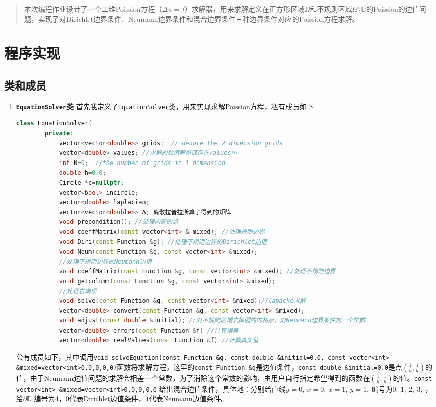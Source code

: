 \documentclass[UTF8]{ctexart}
\begin{document}
	
	\pagestyle{fancy}
	\fancyhead{}
	\rhead{\today}
	\begin{abstract}
		本次编程作业设计了一个二维Poission方程（$\Delta u=f$）求解器，用来求解定义在正方形区域$\Omega$和不规则区域$\Omega \setminus \mathbb{D}$的Poission的边值问题，实现了对Dirichlet边界条件、Neumann边界条件和混合边界条件三种边界条件对应的Poission方程求解。
	\end{abstract}
	\section{程序实现}
	\subsection{类和成员}
	\begin{enumerate}
		\item  \textbf{\texttt{EquationSolver}类}	首先我定义了\texttt{EquationSolver}类，用来实现求解Poission方程，私有成员如下
		\begin{lstlisting}[language=C++, caption={运算符实现}, label={lst:operators}]
		class EquationSolver{
		private:
			vector<vector<double>> grids;  // denote the 2 dimension grids
			vector<double> values; //求解的数值解将储存在values中
			int N=0;  //the number of grids in 1 dimension
			double h=0.0;
			Circle *c=nullptr;
			vector<bool> incircle;
			vector<double> laplacian;
			vector<vector<double>> A; 离散拉普拉斯算子得到的矩阵
			void precondition(); //处理内部的点
			void coeffMatrix(const vector<int> & mixed); //处理规则边界
			void Diri(const Function &g); //处理不规则边界的Dirichlet边值
			void Neum(const Function &g, const vector<int> &mixed);
			//处理不规则边界的Neumann边值
			void coeffMatrix(const Function &g, const vector<int> &mixed); //处理不规则边界
			void getcolumn(const Function &g, const vector<int> &mixed);
			//处理右端项
			void solve(const Function &g, const vector<int> &mixed);//lapacke求解
			vector<double> convert(const Function &g, const vector<int> &mixed);
			void adjust(const double &initial); //对不规则区域去掉圆内的格点，对Neumann边界条件加一个常数
			vector<double> errors(const Function &f) //计算误差
			vector<double> realValues(const Function &f) //计算真实值
		\end{lstlisting}
		公有成员如下，其中调用\texttt{void solveEquation(const Function \&g, const double \&initial=0.0, const vector<int> \&mixed=vector<int>{0,0,0,0,0})}函数将求解方程，这里的\texttt{const Function \&g}是边值条件，\texttt{const double \&initial=0.0}是点$(\frac{1}{h}, \frac{1}{h})$的值，由于Neumann边值问题的求解会相差一个常数，为了消除这个常数的影响，由用户自行指定希望得到的函数在$(\frac{1}{h}, \frac{1}{h})$的值。\texttt{const vector<int> \&mixed=vector<int>{0,0,0,0,0}} 给出混合边值条件，具体地：分别给直线$y=0,\ x=0,\ x=1,\ y=1,\ $编号为$0,\ 1,\ 2,\ 3,\ $，给$\partial \mathbb{D}$ 编号为$4$，$0$代表Dirichlet边值条件，$1$代表Neumann边值条件。

\end{enumerate}
\end{document}
